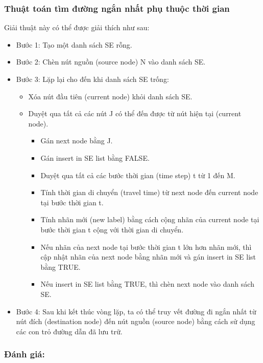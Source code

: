 \documentclass[a4paper]{article}
\begin{document}
    \subsubsection{Thuật toán tìm đường ngắn nhất phụ thuộc thời gian}

    Giải thuật này có thể được giải thích như sau:
    \begin{itemize}
        \item Bước 1: Tạo một danh sách SE rỗng.
        \item Bước 2: Chèn nút nguồn (source node) N vào danh sách SE.
        \item Bước 3: Lặp lại cho đến khi danh sách SE trống:
            \begin{itemize}
                \item Xóa nút đầu tiên (current node) khỏi danh sách SE.
                \item Duyệt qua tất cả các nút J có thể đến được từ nút hiện tại (current node).
                    \begin{itemize}
                        \item Gán next node bằng J.
                        \item Gán insert in SE list bằng FALSE.
                        \item Duyệt qua tất cả các bước thời gian (time step) t từ 1 đến M.
                        \item Tính thời gian di chuyển (travel time) từ next node đến current node tại bước thời gian t.
                        \item Tính nhãn mới (new label) bằng cách cộng nhãn của current node tại bước thời gian t cộng với thời gian di chuyển.
                        \item Nếu nhãn của next node tại bước thời gian t lớn hơn nhãn mới, thì cập nhật nhãn của next node bằng nhãn mới và gán insert in SE list bằng TRUE.
                        \item Nếu insert in SE list bằng TRUE, thì chèn next node vào danh sách SE.
                    \end{itemize}
            \end{itemize}
        \item Bước 4: Sau khi kết thúc vòng lặp, ta có thể truy vết đường đi ngắn nhất từ nút đích (destination node) đến nút nguồn (source node) bằng cách sử dụng các con trỏ đường dẫn đã lưu trữ.
    \end{itemize}

    \subsubsection{Đánh giá:}
\end{document}
